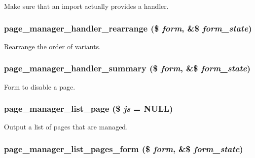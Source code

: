 \label{page__manager_8admin_8inc_a6963064ee84139a0bb64d9cc1b67c55e}
Make sure that an import actually provides a handler. \hypertarget{page__manager_8admin_8inc_a6e324bd1ae431f00d56ddb9ae5ceb280}{
\subsubsection[{page\_\-manager\_\-handler\_\-rearrange}]{\setlength{\rightskip}{0pt plus 5cm}page\_\-manager\_\-handler\_\-rearrange (\$ {\em form}, \/  \&\$ {\em form\_\-state})}}
\label{page__manager_8admin_8inc_a6e324bd1ae431f00d56ddb9ae5ceb280}
Rearrange the order of variants. \hypertarget{page__manager_8admin_8inc_a2b1cdfdd84993c9480b1032309fa8eb4}{
\subsubsection[{page\_\-manager\_\-handler\_\-summary}]{\setlength{\rightskip}{0pt plus 5cm}page\_\-manager\_\-handler\_\-summary (\$ {\em form}, \/  \&\$ {\em form\_\-state})}}
\label{page__manager_8admin_8inc_a2b1cdfdd84993c9480b1032309fa8eb4}
Form to disable a page. \hypertarget{page__manager_8admin_8inc_a4366f90c2f82cba288c4c41e98dc51aa}{
\subsubsection[{page\_\-manager\_\-list\_\-page}]{\setlength{\rightskip}{0pt plus 5cm}page\_\-manager\_\-list\_\-page (\$ {\em js} = {\ttfamily NULL})}}
\label{page__manager_8admin_8inc_a4366f90c2f82cba288c4c41e98dc51aa}
Output a list of pages that are managed. \hypertarget{page__manager_8admin_8inc_a69d5a1c5ff1ecf2d5b566dfaeeb2ae54}{
\subsubsection[{page\_\-manager\_\-list\_\-pages\_\-form}]{\setlength{\rightskip}{0pt plus 5cm}page\_\-manager\_\-list\_\-pages\_\-form (\$ {\em form}, \/  \&\$ {\em form\_\-state})}}
